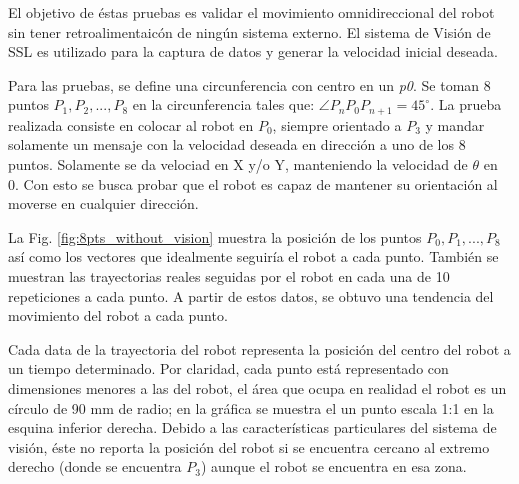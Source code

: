 \documentclass[twocolumn,10pt]{amrob}
\begin{document}
El objetivo de éstas pruebas es validar el movimiento omnidireccional del robot sin tener retroalimentaicón de ningún sistema externo. El sistema de Visión de SSL es utilizado para la captura de datos y generar la velocidad inicial deseada.
\par
Para las pruebas, se define una circunferencia con centro en un \textit{p0}. Se toman 8 puntos ${P_1, P_2, ..., P_8}$ en la circunferencia tales que: $\angle P_nP_0P_{n+1} = 45^\circ $. La prueba realizada consiste en colocar al robot en $P_0$, siempre orientado a $P_3$ y mandar solamente un mensaje con la velocidad deseada en dirección a uno de los 8 puntos. Solamente se da velociad en X y/o Y, manteniendo la velocidad de $\theta$ en 0. Con esto se busca probar que el robot es capaz de mantener su orientación al moverse en cualquier dirección. 
\par
La Fig. \ref{fig:8pts_without_vision} muestra la posición de los puntos $P_0, P_1, ..., P_8$ así como los vectores que idealmente seguiría el robot a cada punto. También se muestran las trayectorias reales seguidas por el robot en cada una de 10 repeticiones a cada punto. A partir de estos datos, se obtuvo una tendencia del movimiento del robot a cada punto. 
\par
Cada data de la trayectoria del robot representa la posición del centro del robot a un tiempo determinado. Por claridad, cada punto está representado con dimensiones menores a las del robot, el área que ocupa en realidad el robot es un círculo de 90 mm de radio; en la gráfica se muestra el un punto escala 1:1 en la esquina inferior derecha. Debido a las características particulares del sistema de visión, éste no reporta la posición del robot si se encuentra cercano al extremo derecho (donde se encuentra $P_3$) aunque el robot se encuentra en esa zona.
\par
\end{document}
